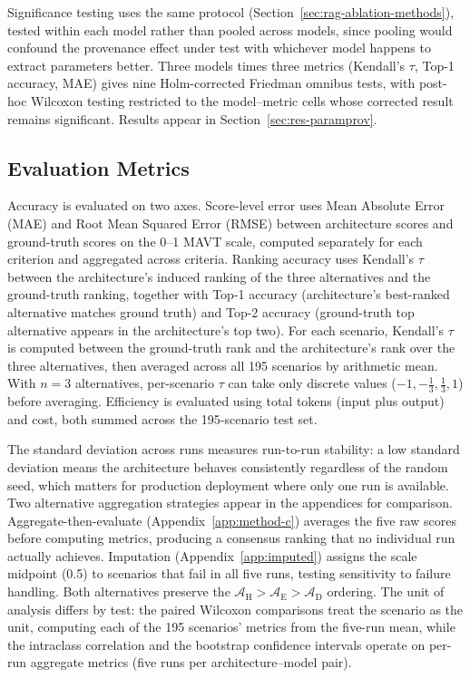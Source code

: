 \documentclass[final,3p,times]{elsarticle}
\begin{document}
Significance testing uses the same protocol (Section~\ref{sec:rag-ablation-methods}), tested within each model rather than pooled across models, since pooling would confound the provenance effect under test with whichever model happens to extract parameters better. Three models times three metrics (Kendall's $\tau$, Top-1 accuracy, MAE) gives nine Holm-corrected Friedman omnibus tests, with post-hoc Wilcoxon testing restricted to the model--metric cells whose corrected result remains significant. Results appear in Section~\ref{sec:res-paramprov}.

\subsection{Evaluation Metrics}
\label{sec:eval-metrics}
Accuracy is evaluated on two axes. Score-level error uses Mean Absolute Error (MAE) and Root Mean Squared Error (RMSE) between architecture scores and ground-truth scores on the 0--1 MAVT scale, computed separately for each criterion and aggregated across criteria. Ranking accuracy uses Kendall's $\tau$ between the architecture's induced ranking of the three alternatives and the ground-truth ranking, together with Top-1 accuracy (architecture's best-ranked alternative matches ground truth) and Top-2 accuracy (ground-truth top alternative appears in the architecture's top two). For each scenario, Kendall's $\tau$ is computed between the ground-truth rank and the architecture's rank over the three alternatives, then averaged across all 195 scenarios by arithmetic mean. With $n=3$ alternatives, per-scenario $\tau$ can take only discrete values ($-1, -\frac{1}{3}, \frac{1}{3}, 1$) before averaging. Efficiency is evaluated using total tokens (input plus output) and cost, both summed across the 195-scenario test set.

 The standard deviation across runs measures run-to-run stability: a low standard deviation means the architecture behaves consistently regardless of the random seed, which matters for production deployment where only one run is available. Two alternative aggregation strategies appear in the appendices for comparison. Aggregate-then-evaluate (Appendix~\ref{app:method-c}) averages the five raw scores before computing metrics, producing a consensus ranking that no individual run actually achieves. Imputation (Appendix~\ref{app:imputed}) assigns the scale midpoint (0.5) to scenarios that fail in all five runs, testing sensitivity to failure handling. Both alternatives preserve the $\mathcal{A}_{\text{H}} > \mathcal{A}_{\text{E}} > \mathcal{A}_{\text{D}}$ ordering. The unit of analysis differs by test: the paired Wilcoxon comparisons treat the scenario as the unit, computing each of the 195 scenarios' metrics from the five-run mean, while the intraclass correlation and the bootstrap confidence intervals operate on per-run aggregate metrics (five runs per architecture--model pair).
\end{document}
